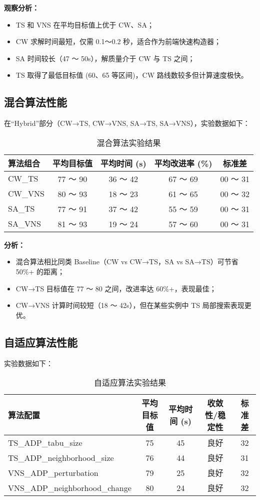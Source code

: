 \documentclass[12pt,a4paper,twoside]{ctexbook}
\begin{document}
\textbf{观察分析：}
\begin{itemize}
    \item TS 和 VNS 在平均目标值上优于 CW、SA；
    \item CW 求解时间最短，仅需 0.1～0.2 秒，适合作为前端快速构造器；
    \item SA 时间较长（47 ～ 50s），解质量介于 CW 与 TS 之间；
    \item TS 取得了最低目标值 (60、65 等区间)，CW 路线数较多但计算速度极快。
\end{itemize}

\subsection{混合算法性能}
在“Hybrid”部分（CW→TS, CW→VNS, SA→TS, SA→VNS），实验数据如下：
\begin{table}[H]
    \centering
    \begin{tabular}{lcccc}
        \hline
        算法组合 & 平均目标值 & 平均时间 (s) & 平均改进率 (\%) & 标准差 \\
        \hline
        CW\_TS & 77 ～ 90 & 36 ～ 42 & 67 ～ 69 & 00 ～ 31 \\
        CW\_VNS & 80 ～ 93 & 18 ～ 23 & 61 ～ 65 & 00 ～ 32 \\
        SA\_TS & 77 ～ 91 & 37 ～ 42 & 55 ～ 59 & 00 ～ 31 \\
        SA\_VNS & 81 ～ 93 & 19 ～ 24 & 57 ～ 60 & 00 ～ 31 \\
        \hline
    \end{tabular}
    \caption{混合算法实验结果}
\end{table}

\textbf{分析：}
\begin{itemize}
    \item 混合算法相比同类 Baseline（CW vs CW→TS，SA vs SA→TS）可节省 50\%+ 的距离；
    \item CW→TS 目标值在 77 ～ 80 之间，改进率达 60\%+，表现最佳；
    \item CW→VNS 计算时间较短（18 ～ 42s），但在某些实例中 TS 局部搜索表现更优。
\end{itemize}

\subsection{自适应算法性能}
实验数据如下：
\begin{table}[H]
    \centering
    \begin{tabular}{lcccc}
        \hline
        算法配置 & 平均目标值 & 平均时间 (s) & 收敛性/稳定性 & 标准差 \\
        \hline
        TS\_ADP\_tabu\_size & 75 & 45 & 良好 & 32 \\
        TS\_ADP\_neighborhood\_size & 76 & 44 & 良好 & 31 \\
        VNS\_ADP\_perturbation & 79 & 25 & 良好 & 32 \\
        VNS\_ADP\_neighborhood\_change & 80 & 24 & 良好 & 32 \\
        \hline
    \end{tabular}
    \caption{自适应算法实验结果}
\end{table}
\end{document}
